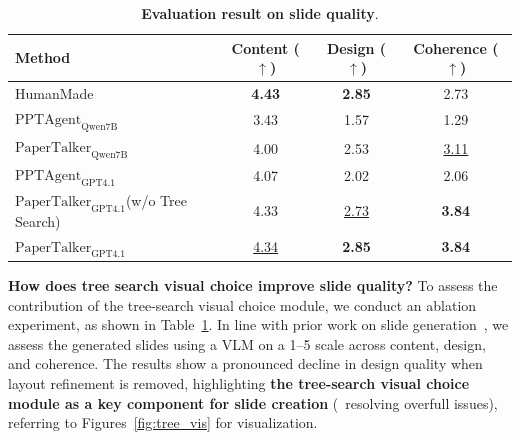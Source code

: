 \begin{table} %
 \vspace{-1\baselineskip} 
  \centering
  \tablesize
  \caption{\textbf{Evaluation result on slide quality}.}
  {
  \setlength{\tabcolsep}{1pt} %
  \begin{tabular}{lccc}
    \toprule
    Method & Content ($\uparrow$) & Design ($\uparrow$) & Coherence ($\uparrow$) \\
    \midrule
    HumanMade & \textbf{4.43} & \textbf{2.85} & 2.73 \\
    \midrule
    $\text{PPTAgent}_\text{Qwen7B}$~\cite{zheng2025pptagent} & 3.43 & 1.57 & 1.29 \\
    $\text{PaperTalker}_\text{Qwen7B}$ & 4.00 & 2.53 & \underline{3.11} \\
    \midrule
    $\text{PPTAgent}_\text{GPT4.1}$~\cite{zheng2025pptagent} & 4.07 & 2.02 & 2.06 \\
    $\text{PaperTalker}_\text{GPT4.1}$(w/o Tree Search) & 4.33 & \underline{2.73} & \textbf{3.84} \\
    $\text{PaperTalker}_\text{GPT4.1}$ & \underline{4.34} & \textbf{2.85} & \textbf{3.84} \\
    \bottomrule
  \end{tabular}
  }
  \label{tab:slide_quality}
\end{table}
\noindent\textbf{How does tree search visual choice improve slide quality?} To assess the contribution of the tree-search visual choice module, we conduct an ablation experiment, as shown in Table~\ref{tab:slide_quality}. In line with prior work on slide generation~\cite{zheng2025pptagent}, we assess the generated slides using a VLM on a 1–5 scale across content, design, and coherence. The results show a pronounced decline in design quality when layout refinement is removed, highlighting \textbf{the tree-search visual choice module as a key component for slide creation} (\ie~resolving overfull issues), referring to Figures~\ref{fig:tree_vis} for visualization.

